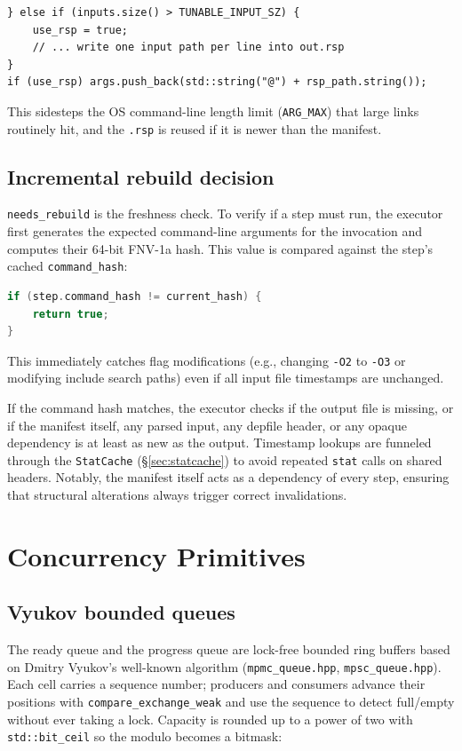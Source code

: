 \documentclass[11pt]{article}
\begin{document}
\begin{lstlisting}
} else if (inputs.size() > TUNABLE_INPUT_SZ) {
    use_rsp = true;
    // ... write one input path per line into out.rsp
}
if (use_rsp) args.push_back(std::string("@") + rsp_path.string());
\end{lstlisting}

This sidesteps the OS command-line length limit (\texttt{ARG\_MAX}) that large
links routinely hit, and the \texttt{.rsp} is reused if it is newer than the
manifest.

\subsection{Incremental rebuild decision}

\lstinline|needs_rebuild| is the freshness check. To verify if a step must run, the executor first generates the expected command-line arguments for the invocation and computes their 64-bit FNV-1a hash. This value is compared against the step's cached \lstinline|command_hash|:
\begin{lstlisting}[language=C++]
if (step.command_hash != current_hash) {
    return true;
}
\end{lstlisting}
This immediately catches flag modifications (e.g., changing \lstinline|-O2| to \lstinline|-O3| or modifying include search paths) even if all input file timestamps are unchanged.

If the command hash matches, the executor checks if the output file is missing, or if the manifest itself, any parsed input, any depfile header, or any opaque dependency is at least as new as the output. Timestamp lookups are funneled through the \lstinline|StatCache| (\S\ref{sec:statcache}) to avoid repeated \lstinline|stat| calls on shared headers. Notably, the manifest itself acts as a dependency of every step, ensuring that structural alterations always trigger correct invalidations.

\section{Concurrency Primitives}

\subsection{Vyukov bounded queues}

The ready queue and the progress queue are lock-free bounded ring buffers based
on Dmitry Vyukov's well-known algorithm (\texttt{mpmc\_queue.hpp},
\texttt{mpsc\_queue.hpp}). Each cell carries a sequence number; producers and
consumers advance their positions with \lstinline|compare_exchange_weak| and use
the sequence to detect full/empty without ever taking a lock. Capacity is
rounded up to a power of two with \lstinline|std::bit_ceil| so the modulo
becomes a bitmask:
\end{document}
